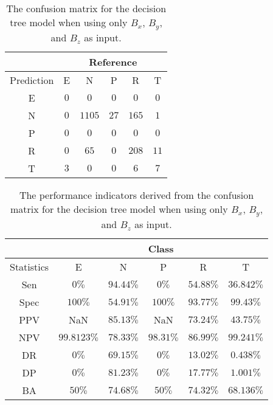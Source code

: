 \begin{table}[!ht]
	\centering
	\begin{tabular}{|c|c|c|c|c|c|}
		\hline
		 & \multicolumn{5}{|c|}{Reference} \\ \hline
		 Prediction & E & N & P & R & T \\ \hline
		 E & $0$ & $0$ & $0$ & $0$ & $0$ \\ \hline
		 N & $0$ & $1105$ & $27$ & $165$ & $1$ \\ \hline
		 P & $0$ & $0$ & $0$ & $0$ & $0$ \\ \hline
		 R & $0$ & $65$ & $0$ & $208$ & $11$ \\ \hline
		 T & $3$ & $0$ & $0$ & $6$ & $7$ \\ \hline
	\end{tabular}
	\caption{The confusion matrix for the decision tree model when using only $B_{x}$, $B_{y}$, and $B_{z}$ as input.}
	\label{tab:cm:coord:C5.0}
\end{table}

\begin{table}[!ht]
	\centering
	\begin{tabular}{|c|c|c|c|c|c|}
		\hline
		 & \multicolumn{5}{c|}{Class} \\ \hline
		Statistics & E & N & P & R & T \\ \hline
		Sen & $0\%$ & $94.44\%$ & $0\%$ & $54.88\%$ & $36.842\%$ \\ \hline
		Spec & $100\%$ & $54.91\%$ & $100\%$ & $93.77\%$ & $99.43\%$ \\ \hline
		PPV & NaN & $85.13\%$ & NaN & $73.24\%$ & $43.75\%$ \\ \hline
		NPV & $99.8123\%$ & $78.33\%$ & $98.31\%$ & $86.99\%$ & $99.241\%$ \\ \hline
		DR & $0\%$ & $69.15\%$ & $0\%$ & $13.02\%$ & $0.438\%$ \\ \hline
		DP & $0\%$ & $81.23\%$ & $0\%$ & $17.77\%$ & $1.001\%$ \\ \hline
		BA & $50\%$ & $74.68\%$ & $50\%$ & $74.32\%$ & $68.136\%$ \\ \hline
	\end{tabular}
	\caption{The performance indicators derived from the confusion matrix for the decision tree model when using only $B_{x}$, $B_{y}$, and $B_{z}$ as input.}
	\label{tab:cs:reverse:coord:C5.0}
\end{table}
